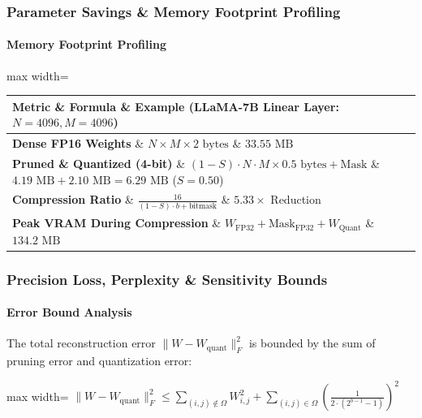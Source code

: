 \subsubsection*{Parameter Savings \& Memory Footprint Profiling}

\paragraph{Memory Footprint Profiling}

\begin{center}
\begin{adjustbox}{max width=\columnwidth}
\renewcommand{\arraystretch}{1.2}
\begin{tabular}{lll}
\toprule
Metric \& Formula \& Example (LLaMA-7B Linear Layer: $N=4096, M=4096$) \\
\midrule
\textbf{Dense FP16 Weights} \& $N \times M \times 2 \text{ bytes}$ \& $33.55 \text{ MB}$ \\
\textbf{Pruned \& Quantized (4-bit)} \& $(1 - S) \cdot N \cdot M \times 0.5 \text{ bytes} + \text{Mask}$ \& $4.19 \text{ MB} + 2.10 \text{ MB} = 6.29 \text{ MB}$ ($S=0.50$) \\
\textbf{Compression Ratio} \& $\frac{16}{(1 - S) \cdot b + \text{bitmask}}$ \& $\mathbf{5.33\times}$ Reduction \\
\textbf{Peak VRAM During Compression} \& $W_{\text{FP32}} + \text{Mask}_{\text{FP32}} + W_{\text{Quant}}$ \& $134.2 \text{ MB}$ \\

\bottomrule
\end{tabular}
\end{adjustbox}
\end{center}

\subsubsection*{Precision Loss, Perplexity \& Sensitivity Bounds}

\paragraph{Error Bound Analysis}

The total reconstruction error $\| W - W_{\text{quant}} \|_F^2$ is bounded by the sum of pruning error and quantization error:

\begin{center}
\begin{adjustbox}{max width=\columnwidth}
$\displaystyle
\| W - W_{\text{quant}} \|_F^2 \le \sum_{(i,j) \notin \Omega} W_{i,j}^2 + \sum_{(i,j) \in \Omega} \left( \frac{1}{2 \cdot (2^{b-1} - 1)} \right)^2
$
\end{adjustbox}
\end{center}

